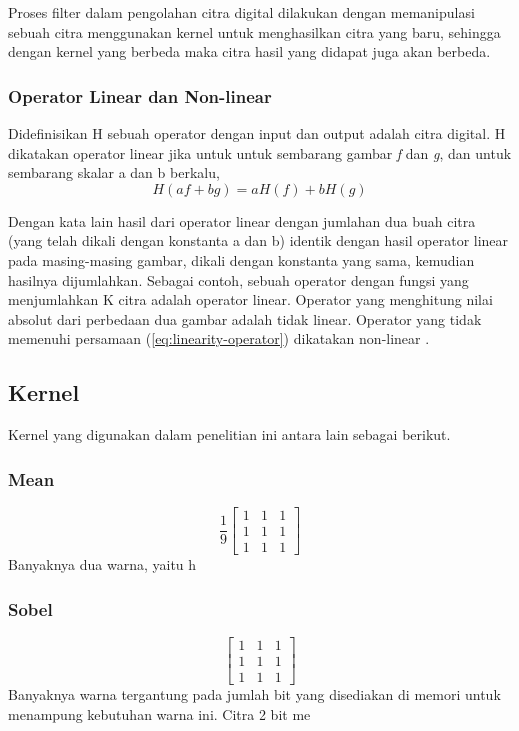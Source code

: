 Proses filter dalam pengolahan citra digital dilakukan dengan memanipulasi sebuah citra menggunakan kernel untuk menghasilkan citra yang baru, sehingga dengan kernel yang berbeda maka citra hasil yang didapat juga akan berbeda. 


\subsubsection{Operator Linear dan Non-linear}
Didefinisikan H sebuah operator dengan input dan output adalah citra digital. H dikatakan operator linear jika untuk untuk sembarang gambar \textit{f} dan \textit{g}, dan untuk sembarang skalar a dan b berkalu,
\begin{equation}
    \label{eq:linearity-operator}
    H(af + bg) = aH(f) + bH(g)
\end{equation}

Dengan kata lain hasil dari operator linear dengan jumlahan dua buah citra (yang telah dikali dengan konstanta a dan b) identik dengan hasil operator linear pada masing-masing gambar, dikali dengan konstanta yang sama, kemudian hasilnya dijumlahkan. Sebagai contoh, sebuah operator dengan fungsi yang menjumlahkan K citra adalah operator linear. Operator yang menghitung nilai absolut dari perbedaan dua gambar adalah tidak linear. Operator yang tidak memenuhi persamaan (\ref{eq:linearity-operator}) dikatakan non-linear .


\subsection{Kernel}
Kernel yang digunakan dalam penelitian ini antara lain sebagai berikut.

\subsubsection{Mean}
\begin{equation*}
    \label{kernel:mean}
    \frac{1}{9} \left[
    \begin{matrix}
        1 & 1 & 1 \\
        1 & 1 & 1 \\
        1 & 1 & 1
    \end{matrix}
    \right]
\end{equation*}
Banyaknya dua warna, yaitu h

\subsubsection{Sobel}
\begin{equation*}
    \label{kernel:mean1}
    \left[
    \begin{matrix}
        1 & 1 & 1 \\
        1 & 1 & 1 \\
        1 & 1 & 1
    \end{matrix}
    \right]
\end{equation*}
Banyaknya warna tergantung pada jumlah bit yang disediakan di memori untuk menampung kebutuhan warna ini. Citra 2 bit me

